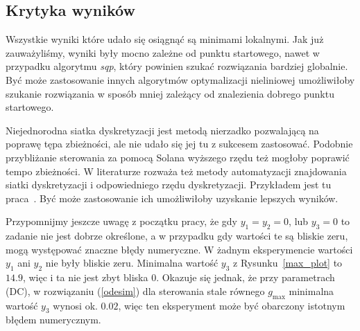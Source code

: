 \documentclass[11pt]{article}
\begin{document}
\subsection{Krytyka wyników}
Wszystkie wyniki które udało się osiągnąć są minimami lokalnymi. Jak już zauważyliśmy, wyniki były mocno zależne od punktu startowego, nawet w przypadku algorytmu {\it sqp}, który powinien szukać rozwiązania bardziej globalnie. Być może zastosowanie innych algorytmów optymalizacji nieliniowej umożliwiłoby szukanie rozwiązania w sposób mniej zależący od znalezienia dobrego punktu startowego.

Niejednorodna siatka dyskretyzacji jest metodą nierzadko pozwalającą na poprawę tępa zbieżności, ale nie udało się jej tu z sukcesem zastosować. Podobnie przybliżanie sterowania za pomocą Solana wyższego rzędu też mogłoby poprawić tempo zbieżności. W literaturze rozważa też metody automatyzacji znajdowania siatki dyskretyzacji i odpowiedniego rzędu dyskretyzacji. Przykładem jest tu praca~\cite{Rao-ph}. Być może zastosowanie ich umożliwiłoby uzyskanie lepszych wyników.

Przypomnijmy jeszcze uwagę z początku pracy, że gdy $y_1 = y_2 = 0$, lub $y_3 = 0$ to zadanie nie jest dobrze określone, a w przypadku gdy wartości te są bliskie zeru, mogą występować znaczne błędy numeryczne. W żadnym eksperymencie wartości $y_1$ ani $y_2$ nie były bliskie zeru. Minimalna wartość $y_3$ z Rysunku~\ref{max_plot} to $14.9$, więc i ta nie jest zbyt bliska 0. Okazuje się jednak, że przy parametrach (DC), w rozwiązaniu (\ref{odesim}) dla sterowania stale równego $g_{\max}$ minimalna wartość $y_3$ wynosi ok. $0.02$, więc ten eksperyment może być obarczony istotnym błędem numerycznym.

\newpage{}
{}

\end{document}
